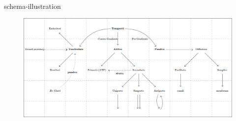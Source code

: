 \documentclass[preview]{standalone}
\begin{document}
\begin{snippet}{schema-illustration}
    \begin{center}
    \begin{figure}[h]
        \centering
        \includegraphics[width=\textwidth]{./resources/schema.png}
    \end{figure}
    \end{center}
\end{snippet}
\end{document}
